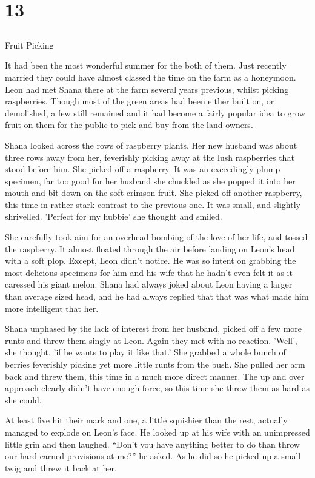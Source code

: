 \chapter{13}
\section{}
Fruit Picking  

It had been the most wonderful summer for the both of them.  Just recently married they could have almost classed the time on the farm as a honeymoon.  Leon had met Shana there at the farm several years previous, whilst picking raspberries.  Though most of the green areas had been either built on, or demolished, a few still remained and it had become a fairly popular idea to grow fruit on them for the public to pick and buy from the land owners.  

Shana looked across the rows of raspberry plants.  Her new husband was about three rows away from her, feverishly picking away at the lush raspberries that stood before him.  She picked off a raspberry.  It was an exceedingly plump specimen, far too good for her husband she chuckled as she popped it into her mouth and bit down on the soft crimson fruit.  She picked off another raspberry, this time in rather stark contrast to the previous one.  It was small, and slightly shrivelled.  'Perfect for my hubbie' she thought and smiled.

She carefully took aim for an overhead bombing of the love of her life, and tossed the raspberry.  It almost floated through the air before landing on Leon's head with a soft plop.  Except, Leon didn't notice.  He was so intent on grabbing the most delicious specimens for him and his wife that he hadn't even felt it as it caressed his giant melon.  Shana had always joked about Leon having a larger than average sized head, and he had always replied that that was what made him more intelligent that her.

Shana unphased by the lack of interest from her husband, picked off a few more runts and threw them singly at Leon.  Again they met with no reaction.  'Well', she thought, 'if he wants to play it like that.'   She grabbed a whole bunch of berries feverishly picking yet more little runts from the bush.  She pulled her arm back and threw them, this time in a much more direct manner.  The up and over approach clearly didn't have enough force, so this time she threw them as hard as she could.  

At least five hit their mark and one, a little squishier than the rest, actually managed to explode on Leon's face.  He looked up at his wife with an unimpressed little grin and then laughed.  ``Don't you have anything better to do than throw our hard earned provisions at me?'' he asked.  As he did so he picked up a small twig and threw it back at her.

